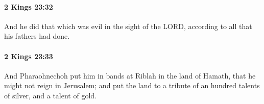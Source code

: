 		\paragraph{2 Kings 23:32} %
			\label{2KINGS-23-32}

			And he did that which was evil in the sight of the LORD, according to all that his fathers had done.


		\paragraph{2 Kings 23:33} %
			\label{2KINGS-23-33}

			And Pharaohnechoh put him in bands at Riblah in the land of Hamath, that he might not reign in Jerusalem; and put the land to a tribute of an hundred talents of silver, and a talent of gold.


